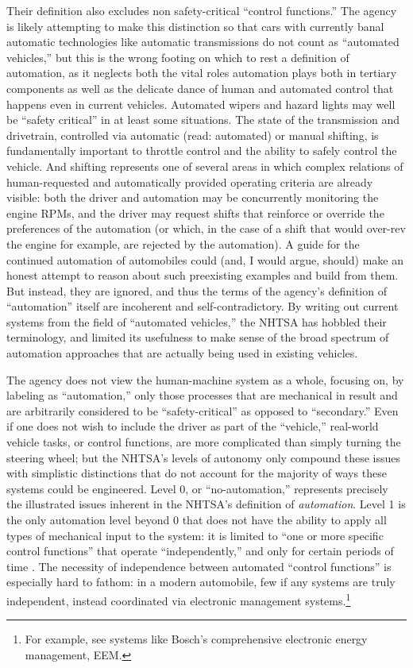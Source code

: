 Their definition also excludes non safety-critical ``control
functions.'' The agency is likely attempting to make this distinction
so that cars with currently banal automatic technologies like
automatic transmissions do 
not count as ``automated vehicles,'' but this is the wrong footing on
which to rest a definition of automation, as it neglects both the
vital roles automation plays both in tertiary components as well as
the delicate dance of human and automated control that happens even in
current vehicles. Automated wipers and hazard
lights may well be ``safety critical'' in at least some situations.
The state of the transmission 
and drivetrain, controlled via automatic (read: automated) or manual
shifting, is fundamentally important to throttle control and the
ability to safely control the vehicle. And shifting represents one of
several areas
in which complex relations of human-requested and
automatically provided operating criteria are already visible: both
the driver and automation may be concurrently monitoring the engine
RPMs, and the driver may request shifts that reinforce or override the
preferences of the automation (or which, in the case of a shift that would
over-rev the engine for example, are rejected by the automation). A guide for the
continued automation of automobiles could (and, I would argue, should)
make an honest attempt to reason about such preexisting examples and
build from them. But instead, they are ignored, and thus the
terms of the agency's definition of ``automation'' itself are incoherent
and self-contradictory. By writing out current systems from the field
of ``automated vehicles,'' the NHTSA has hobbled their terminology,
and limited its usefulness to make sense of the broad spectrum of automation
approaches that are actually being used in existing vehicles.

The agency does not view the human-machine system as a whole, focusing
on, by labeling as ``automation,'' only those processes that are
mechanical in result and are arbitrarily considered to be
``safety-critical'' as opposed to ``secondary.'' Even if one does not
wish to include 
the driver as part of the ``vehicle,'' real-world vehicle tasks, or
control functions, are more complicated than simply turning the
steering wheel; but the NHTSA's levels of autonomy only compound these
issues with simplistic distinctions that do not account for the
majority of ways these systems could be engineered. Level 0, or
``no-automation,'' represents 
precisely the illustrated issues inherent in the NHTSA's definition of
\emph{automation}. Level 
1 is the only automation level beyond 0 that does not have the
ability to apply all types of mechanical input to the system: it is
limited to ``one or more specific control functions'' that operate
``independently,'' and only for certain periods of time \cite[p. 4]{NHTSA}. The
necessity of independence between automated ``control functions'' is
especially hard to fathom: in a modern automobile, few if any systems
are truly independent, instead coordinated via electronic management
systems.\footnote{For example, see systems like Bosch's comprehensive
  electronic energy management, EEM.} 

